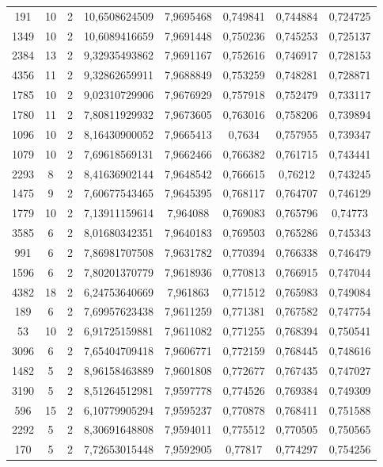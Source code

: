 \begin{longtable}{|c|c|c|c|c|c|c|c|}
191 & 10 & 2 & 10,6508624509 & 7,9695468 & 0,749841 & 0,744884 & 0,724725 \\
1349 & 10 & 2 & 10,6089416659 & 7,9691448 & 0,750236 & 0,745253 & 0,725137 \\
2384 & 13 & 2 & 9,32935493862 & 7,9691167 & 0,752616 & 0,746917 & 0,728153 \\
4356 & 11 & 2 & 9,32862659911 & 7,9688849 & 0,753259 & 0,748281 & 0,728871 \\
1785 & 10 & 2 & 9,02310729906 & 7,9676929 & 0,757918 & 0,752479 & 0,733117 \\
1780 & 11 & 2 & 7,80811929932 & 7,9673605 & 0,763016 & 0,758206 & 0,739894 \\
1096 & 10 & 2 & 8,16430900052 & 7,9665413 & 0,7634 & 0,757955 & 0,739347 \\
1079 & 10 & 2 & 7,69618569131 & 7,9662466 & 0,766382 & 0,761715 & 0,743441 \\
2293 & 8 & 2 & 8,41636902144 & 7,9648542 & 0,766615 & 0,76212 & 0,743245 \\
1475 & 9 & 2 & 7,60677543465 & 7,9645395 & 0,768117 & 0,764707 & 0,746129 \\
1779 & 10 & 2 & 7,13911159614 & 7,964088 & 0,769083 & 0,765796 & 0,74773 \\
3585 & 6 & 2 & 8,01680342351 & 7,9640183 & 0,769503 & 0,765286 & 0,745343 \\
991 & 6 & 2 & 7,86981707508 & 7,9631782 & 0,770394 & 0,766338 & 0,746479 \\
1596 & 6 & 2 & 7,80201370779 & 7,9618936 & 0,770813 & 0,766915 & 0,747044 \\
4382 & 18 & 2 & 6,24753640669 & 7,961863 & 0,771512 & 0,765983 & 0,749084 \\
189 & 6 & 2 & 7,69957623438 & 7,9611259 & 0,771381 & 0,767582 & 0,747754 \\
53 & 10 & 2 & 6,91725159881 & 7,9611082 & 0,771255 & 0,768394 & 0,750541 \\
3096 & 6 & 2 & 7,65404709418 & 7,9606771 & 0,772159 & 0,768445 & 0,748616 \\
1482 & 5 & 2 & 8,96158463889 & 7,9601808 & 0,772677 & 0,767435 & 0,747027 \\
3190 & 5 & 2 & 8,51264512981 & 7,9597778 & 0,774526 & 0,769384 & 0,749309 \\
596 & 15 & 2 & 6,10779905294 & 7,9595237 & 0,770878 & 0,768411 & 0,751588 \\
2292 & 5 & 2 & 8,30691648808 & 7,9594011 & 0,775512 & 0,770505 & 0,750565 \\
170 & 5 & 2 & 7,72653015448 & 7,9592905 & 0,77817 & 0,774297 & 0,754256 \\

\end{longtable}
